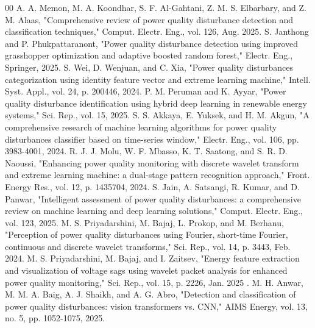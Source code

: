 \documentclass[conference]{IEEEtran}
\begin{document}
\begin{thebibliography}{00}
 A. A. Memon, M. A. Koondhar, S. F. Al-Gahtani, Z. M. S. Elbarbary,
    and Z. M. Alaas, "Comprehensive review of power quality disturbance
    detection and classification techniques," Comput. Electr. Eng.,
    vol. 126, Aug. 2025.
  S. Janthong and P. Phukpattaranont, "Power quality disturbance
    detection using improved grasshopper optimization and adaptive
    boosted random forest," Electr. Eng., Springer, 2025.
 S. Wei, D. Wenjuan, and C. Xia, "Power quality disturbances
    categorization using identity feature vector and extreme learning
    machine," Intell. Syst. Appl., vol. 24, p. 200446, 2024.
 P. M. Peruman and K. Ayyar, "Power quality disturbance
    identification using hybrid deep learning in renewable energy
    systems," Sci. Rep., vol. 15, 2025.
 S. S. Akkaya, E. Yuksek, and H. M. Akgun, "A comprehensive
    research of machine learning algorithms for power quality
    disturbances classifier based on time-series window,"
    Electr. Eng., vol. 106, pp. 3983-4001, 2024.
 R. J. J. Molu, W. F. Mbasso, K. T. Saatong, and S. R. D. Naoussi,
    "Enhancing power quality monitoring with discrete wavelet transform
    and extreme learning machine: a dual-stage pattern recognition
    approach," Front. Energy Res., vol. 12, p. 1435704, 2024.
 S. Jain, A. Satsangi, R. Kumar, and D. Panwar, "Intelligent
    assessment of power quality disturbances: a comprehensive review
    on machine learning and deep learning solutions," Comput. Electr.
    Eng., vol. 123, 2025.
 M. S. Priyadarshini, M. Bajaj, L. Prokop, and M. Berhanu, "Perception of power quality disturbances using Fourier, short-time Fourier, continuous and discrete wavelet transforms," Sci. Rep., vol. 14, p. 3443, Feb. 2024.
 M. S. Priyadarshini, M. Bajaj, and I. Zaitsev, "Energy feature extraction and visualization of voltage sags using wavelet packet analysis for enhanced power quality monitoring," Sci. Rep., vol. 15, p. 2226, Jan. 2025 .
  M. H. Anwar, M. M. A. Baig, A. J. Shaikh, and A. G. Abro,
     "Detection and classification of power quality disturbances:
     vision transformers vs. CNN," AIMS Energy, vol. 13, no. 5,
     pp. 1052-1075, 2025.
\end{thebibliography}
\vspace{12pt}
\end{document}
